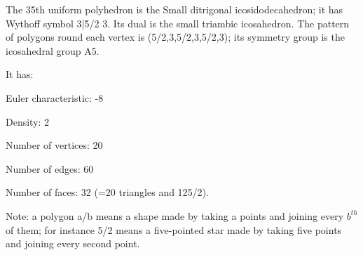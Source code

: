 The 35th uniform polyhedron is the Small ditrigonal icosidodecahedron; it has Wythoff symbol 3|5/2 3. Its dual is the small triambic icosahedron. The pattern of polygons round each vertex is (5/2,3,5/2,3,5/2,3); its symmetry group is the icosahedral group A5.\par
It has:\par
Euler characteristic: -8\par
Density: 2\par
Number of vertices: 20\par
Number of edges:  60\par
Number of faces: 32 (=20 triangles and 12{5/2}).\par
Note: a polygon a/b means a shape made by taking a points and joining every $b^{th}$  of them; for instance 5/2 means a five-pointed star made by taking five points and joining every second point.